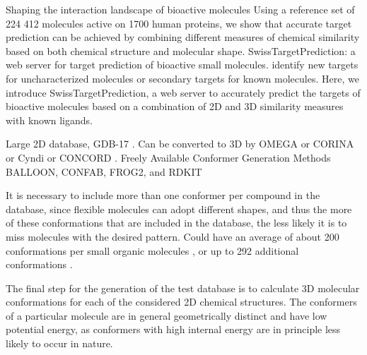 \citep{1407} Shaping the interaction landscape of bioactive molecules
\citep{1407} Using a reference set of 224 412 molecules active on 1700 human proteins, we show that accurate target prediction can be achieved by combining different measures of chemical similarity based on both chemical structure and molecular shape.
\citep{1408} SwissTargetPrediction: a web server for target prediction of bioactive small molecules. identify new targets for uncharacterized molecules or secondary targets for known molecules. Here, we introduce SwissTargetPrediction, a web server to accurately predict the targets of bioactive molecules based on a combination of 2D and 3D similarity measures with known ligands.

Large 2D database, GDB-17 \citep{1276}. Can be converted to 3D by OMEGA \citep{462} or CORINA \citep{1392} or Cyndi \citep{1393,1394} or CONCORD \citep{}. Freely Available Conformer Generation Methods \citep{1127} BALLOON, CONFAB, FROG2, and RDKIT

It is necessary to include more than one conformer per compound in the database, since flexible molecules can adopt different shapes, and thus the more of these conformations that are included in the database, the less likely it is to miss molecules with the desired pattern. Could have an average of about 200 conformations per small organic molecules \citep{1332}, or up to 292 additional conformations \citep{1280}.

The final step for the generation of the test database is to calculate 3D molecular conformations for each of the considered 2D chemical structures. The conformers of a particular molecule are in general geometrically distinct and have low potential energy, as conformers with high internal energy are in principle less likely to occur in nature.

